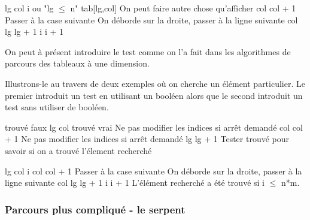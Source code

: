 \begin{Pseudocode}
	\Let lg 
	\Let col 
	\Let i 
	 \RComment ou "lg $\le$ n" 
		\Write tab[lg,col] \RComment On peut faire autre chose qu'afficher
		\Let col \Gets col + 1	\RComment Passer à la case suivante
		 \RComment On déborde sur la droite, passer à la ligne suivante
			\Let col 
			\Let lg \Gets lg + 1
		\EndIf
		\Let i \Gets i + 1		
	\EndWhile
\end{Pseudocode}

On peut à présent introduire le test comme on l'a fait 
dans les algorithmes de parcours des tableaux à une dimension.

Illustrons-le au travers de deux exemples
où on cherche un élément particulier.
Le premier introduit un test en utilisant un booléen
alors que le second introduit un test
sans utiliser de booléen.

\begin{Pseudocode}
	\Let trouvé \Gets faux
	\Let lg 
		\Let col 
				\Let trouvé \Gets vrai
			\Else \RComment Ne pas modifier les indices si arrêt demandé
				\Let col \Gets col + 1
			\EndIf
		\EndWhile
		 \RComment Ne pas modifier les indices si arrêt demandé
			\Let lg \Gets lg + 1
		\EndIf
	\EndWhile
	\LComment Tester trouvé pour savoir si on a trouvé l'élement recherché
\end{Pseudocode}

\begin{Pseudocode}
	\Let lg 
	\Let col 
	\Let i 
		\Let col \Gets col + 1	\RComment Passer à la case suivante
		 \RComment On déborde sur la droite, passer à la ligne suivante
			\Let col 
			\Let lg \Gets lg + 1
		\EndIf
		\Let i \Gets i + 1		
	\EndWhile
	\LComment L'élément recherché a été trouvé si i $\le$ n*m.
\end{Pseudocode}

\subsubsection*{Parcours plus compliqué - le serpent}

